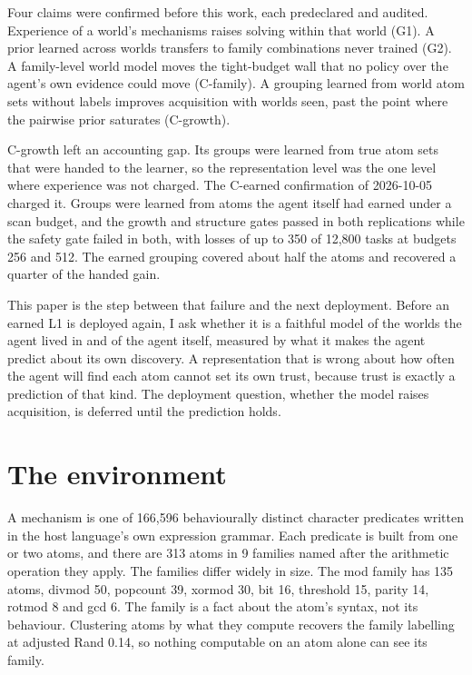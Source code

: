 \documentclass[11pt]{article}
\begin{document}
Four claims were confirmed before this work, each predeclared and audited. Experience of a world's mechanisms raises solving within that world (G1). A prior learned across worlds transfers to family combinations never trained (G2). A family-level world model moves the tight-budget wall that no policy over the agent's own evidence could move (C-family). A grouping learned from world atom sets without labels improves acquisition with worlds seen, past the point where the pairwise prior saturates (C-growth).

C-growth left an accounting gap. Its groups were learned from true atom sets that were handed to the learner, so the representation level was the one level where experience was not charged. The C-earned confirmation of 2026-10-05 charged it. Groups were learned from atoms the agent itself had earned under a scan budget, and the growth and structure gates passed in both replications while the safety gate failed in both, with losses of up to 350 of 12,800 tasks at budgets 256 and 512. The earned grouping covered about half the atoms and recovered a quarter of the handed gain.

This paper is the step between that failure and the next deployment. Before an earned L1 is deployed again, I ask whether it is a faithful model of the worlds the agent lived in and of the agent itself, measured by what it makes the agent predict about its own discovery. A representation that is wrong about how often the agent will find each atom cannot set its own trust, because trust is exactly a prediction of that kind. The deployment question, whether the model raises acquisition, is deferred until the prediction holds.

\section{The environment}

A mechanism is one of 166,596 behaviourally distinct character predicates written in the host language's own expression grammar. Each predicate is built from one or two atoms, and there are 313 atoms in 9 families named after the arithmetic operation they apply. The families differ widely in size. The mod family has 135 atoms, divmod 50, popcount 39, xormod 30, bit 16, threshold 15, parity 14, rotmod 8 and gcd 6. The family is a fact about the atom's syntax, not its behaviour. Clustering atoms by what they compute recovers the family labelling at adjusted Rand 0.14, so nothing computable on an atom alone can see its family.
\end{document}
